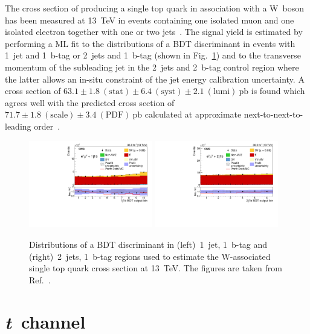 \documentclass{PoS}
\begin{document}
The cross section of producing a single top quark in association with a W~boson has been measured at 13~TeV in events containing one isolated muon and one isolated electron together with one or two jets~\cite{tWch}. The signal yield is estimated by performing a ML fit to the distributions of a BDT discriminant in events with 1~jet and 1~b-tag or 2~jets and 1~b-tag (shown in Fig.~\ref{fig:tw-channel-bdt}) and to the transverse momentum of the subleading jet in the 2~jets and 2~b-tag control region where the latter allows an in-situ constraint of the jet energy calibration uncertainty. A cross section of ${63.1\pm1.8~\mathrm{(stat)}\pm6.4~\mathrm{(syst)}\pm2.1~\mathrm{(lumi)}~\mathrm{pb}}$ is found which agrees well with the predicted cross section of ${71.7\pm1.8~\mathrm{(scale)}\pm3.4~\mathrm{(PDF)}~\mathrm{pb}}$ calculated at approximate next-to-next-to-leading order~\cite{tw-xsec}.

\begin{figure}[!htb]
\begin{center}
\includegraphics[width=0.48\textwidth]{tw2.pdf}\hspace{0.02\textwidth}
\includegraphics[width=0.48\textwidth]{tw3.pdf}
\caption{\label{fig:tw-channel-bdt}Distributions of a BDT discriminant in (left)~1~jet, 1~b-tag and (right)~2~jets, 1~b-tag regions used to estimate the W-associated single top quark cross section at 13~TeV. The figures are taken from Ref.~\cite{tWch}.}
\end{center}
\end{figure}

\section{\textit{t}~channel}
\end{document}
